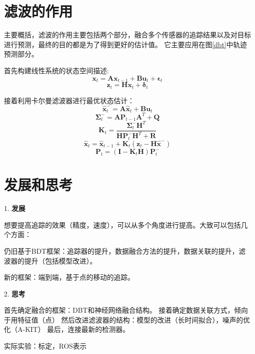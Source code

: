 \section{滤波的作用}
主要概括，滤波的作用主要包括两个部分，融合多个传感器的追踪结果以及对目标进行预测，最终的目的都是为了得到更好的估计值。
它主要应用在图\ref{dbt}中轨迹预测部分。

\begin{tcolorbox}[]
	首先构建线性系统的状态空间描述:
	$$ \mathbf{x}_{t} = \mathbf{A} \mathbf{x}_{t-1} + \mathbf{B} \mathbf{u}_{t} + \bm{\epsilon}_{t} $$
	$$  \mathbf{z}_{t} = \mathbf{H} \mathbf{x}_{t} + \bm{\delta}_{t} $$
	
	接着利用卡尔曼滤波器进行最优状态估计：
	\begin{equation}
		\hat{\bm{x}}_{t}^{-} =  \bm{A} \hat{\bm{x}}_{t} + \bm{B} \bm{u}_t
	\end{equation}
	\begin{equation}
		\bm{\Sigma}_{t}^{-} = \bm{A} \bm{P}_{t-1} \bm{A}^{T} + \bm{Q}
	\end{equation}
	\begin{equation}
		\bm{K}_t = \frac{\bm{\Sigma}_{t}^{-} \bm{H}^{T}}{\bm{H} \bm{P}_{t}^{-} \bm{H}^{T} + \bm{R} }
	\end{equation}
	\begin{equation}
		\hat{\bm{x}}_t = \hat{\bm{x}}_{t-1} + \bm{K}_t(\bm{z}_t - \bm{H} \hat{\bm{x}}^{-})
	\end{equation}
	\begin{equation}
		\bm{P}_t = (\bm{I} - \bm{K}_t \bm{H}) \bm{P}_{t}^{-}
	\end{equation}
	
\end{tcolorbox}

\section{发展和思考}
1. \textbf{发展}

想要提高追踪的效果（精度，速度），可以从多个角度进行提高。大致可以包括几个方面：

仍旧基于BDT框架：追踪器的提升，数据融合方法的提升，数据关联的提升，滤波器的提升（包括模型改进）。

新的框架：端到端\cite{10610979}，基于点的移动的追踪\cite{wu2024moving}。

2. \textbf{思考}

首先确定融合的框架：DBT和神经网络融合结构。
接着确定数据关联方式，倾向于用特征值（点）
然后改进滤波器的结构：模型的改进（长时间拟合），噪声的优化（A-KIT）
最后，连接最新的检测器。

实际实验：标定，ROS表示


